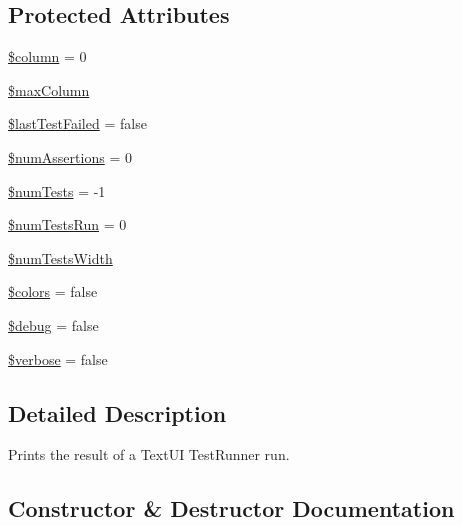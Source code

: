 \subsection*{Protected Attributes}
\begin{DoxyCompactItemize}
\item 
\mbox{\hyperlink{class_p_h_p_unit___text_u_i___result_printer_a60e9ae05178c483ab3d9ff5c2399a463}{\$column}} = 0
\item 
\mbox{\hyperlink{class_p_h_p_unit___text_u_i___result_printer_a32ac3a45213ef1ae74d30b50e1f9335d}{\$max\+Column}}
\item 
\mbox{\hyperlink{class_p_h_p_unit___text_u_i___result_printer_aaf57dc4adb04a3dbb164c0524657c562}{\$last\+Test\+Failed}} = false
\item 
\mbox{\hyperlink{class_p_h_p_unit___text_u_i___result_printer_a0858d25221c3e36da3e132efcac34035}{\$num\+Assertions}} = 0
\item 
\mbox{\hyperlink{class_p_h_p_unit___text_u_i___result_printer_a85a19fb72faf893f5bc2fc25058c2223}{\$num\+Tests}} = -\/1
\item 
\mbox{\hyperlink{class_p_h_p_unit___text_u_i___result_printer_ab3ed276531a5bd1adf1728c2eb99dddf}{\$num\+Tests\+Run}} = 0
\item 
\mbox{\hyperlink{class_p_h_p_unit___text_u_i___result_printer_a20415328da688b6e48eed0db25476846}{\$num\+Tests\+Width}}
\item 
\mbox{\hyperlink{class_p_h_p_unit___text_u_i___result_printer_a7bb8af4e80c138d129aaa0e892ba4cbf}{\$colors}} = false
\item 
\mbox{\hyperlink{class_p_h_p_unit___text_u_i___result_printer_a85ae3e64cd40e9564adceb010085e9dd}{\$debug}} = false
\item 
\mbox{\hyperlink{class_p_h_p_unit___text_u_i___result_printer_a465cd15e121083ca0745bc9c1186cbda}{\$verbose}} = false
\end{DoxyCompactItemize}


\subsection{Detailed Description}
Prints the result of a Text\+UI Test\+Runner run. 

\subsection{Constructor \& Destructor Documentation}
\mbox{\label{class_p_h_p_unit___text_u_i___result_printer_ae4e0dee58dda71835e8dcb2f92f04046}} 
